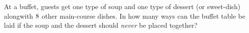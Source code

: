 
%
%
%
%      
% 
% 
%   



\gcalcexpr[0]
\gcalcexpr[0]
\gcalcexpr[0]

\question[3] At a buffet, guests get one type of soup and one type of dessert (or sweet-dish) alongwith $8$ other 
main-course dishes. In how many ways can the buffet table be laid if the soup and the dessert should \textit{never} be
placed together? 

